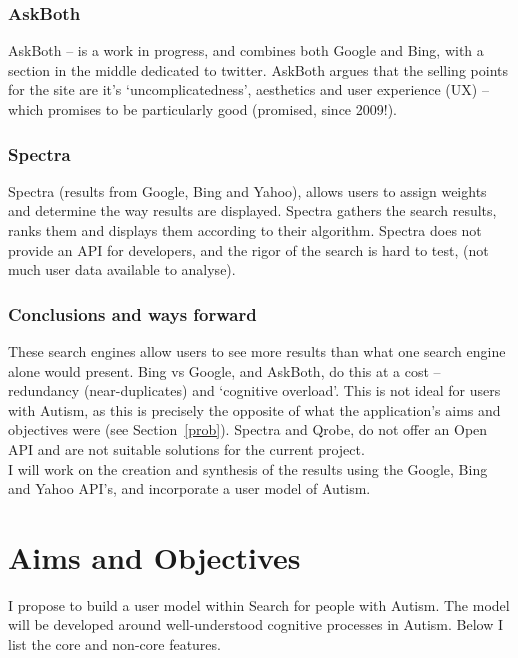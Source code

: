 \documentclass[a4paper, 11pt]{article}
\begin{document}
\subsubsection{AskBoth}
AskBoth – is a work in progress, and combines both Google and Bing, with a section in the middle dedicated to twitter. AskBoth argues that the selling points for the site are it’s ‘uncomplicatedness’, aesthetics and user experience (UX) – which promises to be particularly good (promised, since 2009!).

\subsubsection{Spectra}
Spectra (results from Google, Bing and Yahoo), allows users to assign weights and determine the way results are displayed. Spectra gathers the search results, ranks them and displays them according to their algorithm. Spectra does not provide an API for developers, and the rigor of the search is hard to test, (not much user data available to analyse).

\subsubsection{Conclusions and ways forward}
These search engines allow users to see more results than what one search engine alone would present. Bing vs Google, and AskBoth, do this at a cost -- redundancy (near-duplicates) and ‘cognitive overload’. This is not ideal for users with Autism, as this is precisely the opposite of what the application's aims and objectives were (see Section~\ref{prob}). Spectra and Qrobe, do not offer an Open API and are not suitable solutions for the current project. \\
I will work on the creation and synthesis of the results using the Google, Bing and Yahoo API's, and incorporate a user model of Autism.

\section{Aims and Objectives} 
I propose to build a user model within Search for people with Autism. The model will be developed around well-understood cognitive processes in Autism. Below I list the core and non-core features. 
\end{document}
